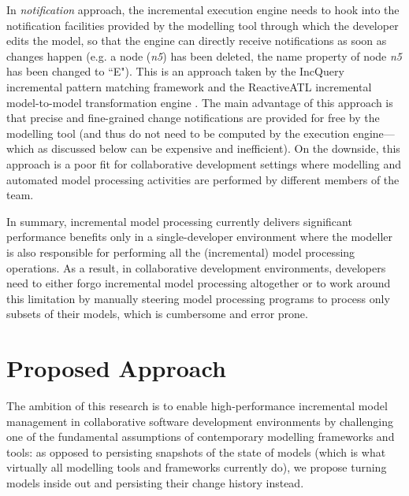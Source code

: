 \documentclass{llncs}
\begin{document}
In \emph{notification} approach, the incremental execution engine needs to hook into the notification facilities provided by the modelling tool through which the developer edits the model, so that the engine can directly receive notifications as soon as changes happen (e.g. a node (\emph{n5}) has been deleted, the name property of node \emph{n5} has been changed to ``E"). This is an approach taken by the IncQuery incremental pattern matching framework \cite{rath2012derived} and the ReactiveATL incremental model-to-model transformation engine \cite{ogunyomi2015property}. The main advantage of this approach is that precise and fine-grained change notifications are provided for free by the modelling tool (and thus do not need to be computed by the execution engine---which as discussed below can be expensive and inefficient). On the downside, this approach is a poor fit for collaborative development settings where modelling and automated model processing activities are performed by different members of the team.

In summary, incremental model processing currently delivers significant performance benefits only in a single-developer environment where the modeller is also responsible for performing all the (incremental) model processing operations. As a result, in collaborative development environments, developers need to either forgo incremental model processing altogether or to work around this limitation by manually steering model processing programs to process only subsets of their models, which is cumbersome and error prone.

\section{Proposed Approach}
\label{sec:proposed_approach}
The ambition of this research is to enable high-performance incremental model management in collaborative software development environments by challenging one of the fundamental assumptions of contemporary modelling frameworks and tools: as opposed to persisting snapshots of the state of models (which is what virtually all modelling tools and frameworks currently do), we propose turning models inside out and persisting their change history instead.
\end{document}
